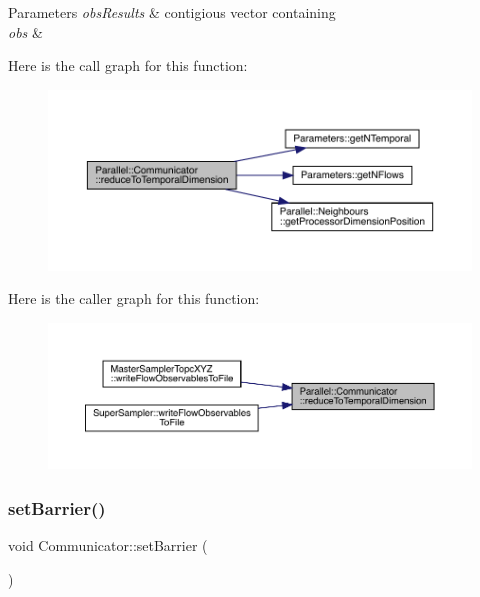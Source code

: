 \begin{DoxyParams}{Parameters}
{\em obs\+Results} & contigious vector containing \\
\hline
{\em obs} & \\
\hline
\end{DoxyParams}
Here is the call graph for this function\+:
\nopagebreak
\begin{figure}[H]
\begin{center}
\leavevmode
\includegraphics[width=350pt]{class_parallel_1_1_communicator_a5d42989e7a3022de6042e3503aa35346_cgraph}
\end{center}
\end{figure}
Here is the caller graph for this function\+:
\nopagebreak
\begin{figure}[H]
\begin{center}
\leavevmode
\includegraphics[width=350pt]{class_parallel_1_1_communicator_a5d42989e7a3022de6042e3503aa35346_icgraph}
\end{center}
\end{figure}
\mbox{\label{class_parallel_1_1_communicator_a14aa3d54f5efe28094df886948e3dee2}} 
\subsubsection{\texorpdfstring{setBarrier()}{setBarrier()}}
{\footnotesize\ttfamily void Communicator\+::set\+Barrier (\begin{DoxyParamCaption}{ }\end{DoxyParamCaption})\hspace{0.3cm}{\ttfamily [static]}}

